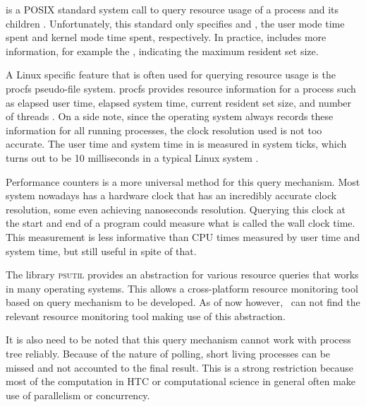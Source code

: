  is a POSIX standard system call to query resource usage of a process and its children \citep{manpages}.
Unfortunately, this standard only specifies  and , the user mode time spent and kernel mode time spent, respectively.
In practice,  includes more information, for example the , indicating the maximum resident set size.

A Linux specific feature that is often used for querying resource usage is the procfs pseudo-file system.
procfs provides resource information for a process such as elapsed user time, elapsed system time, current resident set size, and number of threads \citep{manpages}.
On a side note, since the operating system always records these information for all running processes, the clock resolution used is not too accurate.
The user time and system time in  is measured in system ticks, which turns out to be 10 milliseconds in a typical Linux system \citep{manpages}.



Performance counters is a more universal method for this query mechanism.
Most system nowadays has a hardware clock that has an incredibly accurate clock resolution, some even achieving nanoseconds resolution.
Querying this clock at the start and end of a program could measure what is called the wall clock time.
This measurement is less informative than CPU times measured by user time and system time, but still useful in spite of that.

The library \textsc{psutil} \citep{rodolaCrossplatformLibProcess2019} provides an abstraction for various resource queries that works in many operating systems.
This allows a cross-platform resource monitoring tool based on query mechanism to be developed.
As of now however, \first~can not find the relevant resource monitoring tool making use of this abstraction.

It is also need to be noted that this query mechanism cannot work with process tree reliably.
Because of the nature of polling, short living processes can be missed and not accounted to the final result.
This is a strong restriction because most of the computation in HTC or computational science in general often make use of parallelism or concurrency.


